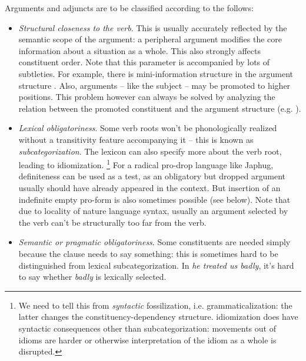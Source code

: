 \documentclass[a4paper, oneside, 12pt]{report}
\newcommand*{\term}[1]{\emph{#1}}
\newcommand{\form}[1]{\emph{#1}}
\begin{document}
Arguments and adjuncts are to be classified according to the follows:
\begin{itemize}
    \item \emph{Structural closeness to the verb}.
    This is usually accurately reflected by the semantic scope of the argument:
    a peripheral argument modifies the core information about a situation as a whole.
    This also strongly affects constituent order.
    Note that this parameter is accompanied by lots of subtleties.
    For example, there is mini-information structure in the argument structure \citep{devine2006latin}.
    Also, arguments -- like the subject -- may be promoted to higher positions.
    This problem however can always be solved by analyzing the relation 
    between the promoted constituent and the argument structure
    (e.g. ).

    \item \emph{Lexical obligatoriness}.
    Some verb roots won't be phonologically realized without a transitivity feature accompanying it
    -- this is known as \term{subcategorization}.
    The lexicon can also specify more about the verb root,
    leading to idiomization.%
    \footnote{
        We need to tell this from \emph{syntactic} fossilization, i.e. grammaticalization:
        the latter changes the constituency-dependency structure.
        idiomization does have syntactic consequences other than subcategorization:
        movements out of idioms are harder or otherwise interpretation of the idiom as a whole is disrupted.
    }
    For a radical pro-drop language like Japhug,
    definiteness can be used as a test,
    as an obligatory but dropped argument usually should have already appeared in the context.
    But insertion of an indefinite empty pro-form is also sometimes possible (see below).
    Note that due to locality of nature language syntax,
    usually an argument selected by the verb can't be structurally too far from the verb.
    
    \item \emph{Semantic or pragmatic obligatoriness}.
    Some constituents are needed simply because the clause needs to say something:
    this is sometimes hard to be distinguished from lexical subcategorization.
    In \form{he treated us badly}, it's hard to say whether \form{badly} is lexically selected.


\end{itemize}
\end{document}
